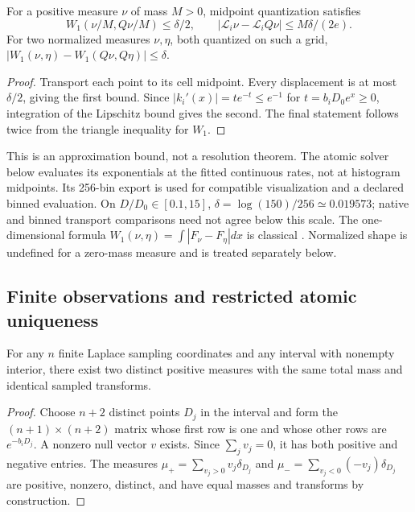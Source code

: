 \begin{Proposition}\label{prop:quantization}
For a positive measure $\nu$ of mass $M>0$, midpoint quantization satisfies
\begin{equation}\label{eq:quantization}
 W_1(\nu/M,Q\nu/M)\leq\delta/2,\qquad
 |\mathcal L_i\nu-\mathcal L_iQ\nu|\leq M\delta/(2e).
\end{equation}
For two normalized measures $\nu,\eta$, both quantized on such a grid,
$|W_1(\nu,\eta)-W_1(Q\nu,Q\eta)|\leq\delta$.
\end{Proposition}
\begin{proof}
Transport each point to its cell midpoint. Every displacement is at most $\delta/2$, giving the first bound. Since
$|k_i'(x)|=t e^{-t}\leq e^{-1}$ for $t=b_iD_0e^x\geq0$, integration of the Lipschitz bound gives the second. The final statement follows twice from the triangle inequality for $W_1$.
\end{proof}

This is an approximation bound, not a resolution theorem. The atomic solver below evaluates its exponentials at the fitted continuous rates, not at histogram midpoints. Its 256-bin export is used for compatible visualization and a declared binned evaluation. On $D/D_0\in[0.1,15]$, $\delta=\log(150)/256\simeq0.019573$; native and binned transport comparisons need not agree below this scale. The one-dimensional formula $W_1(\nu,\eta)=\int|F_\nu-F_\eta|dx$ is classical \cite{vallender}. Normalized shape is undefined for a zero-mass measure and is treated separately below.

\subsection{Finite observations and restricted atomic uniqueness}
\begin{Proposition}\label{prop:ambiguity}
For any $n$ finite Laplace sampling coordinates and any interval with nonempty interior, there exist two distinct positive measures with the same total mass and identical sampled transforms.
\end{Proposition}
\begin{proof}
Choose $n+2$ distinct points $D_j$ in the interval and form the $(n+1)\times(n+2)$ matrix whose first row is one and whose other rows are $e^{-b_iD_j}$. A nonzero null vector $v$ exists. Since $\sum_jv_j=0$, it has both positive and negative entries. The measures $\mu_+=\sum_{v_j>0}v_j\delta_{D_j}$ and $\mu_-=\sum_{v_j<0}(-v_j)\delta_{D_j}$ are positive, nonzero, distinct, and have equal masses and transforms by construction.
\end{proof}

